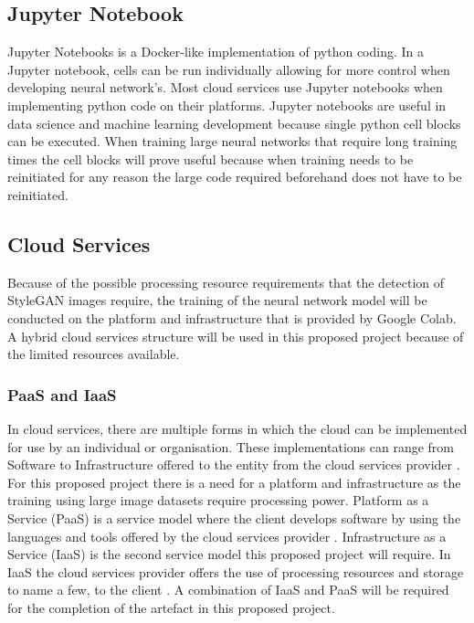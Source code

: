 \subsection{Jupyter Notebook}

Jupyter Notebooks is a Docker-like implementation of python coding. In a Jupyter notebook, cells can be run individually allowing for more control when developing neural network's. Most cloud services use Jupyter notebooks when implementing python code on their platforms. Jupyter notebooks are useful in data science and machine learning development because single python cell blocks can be executed. When training large neural networks that require long training times the cell blocks will prove useful because when training needs to be reinitiated for any reason the large code required beforehand does not have to be reinitiated.


\subsection{Cloud Services}

Because of the possible processing resource requirements that the detection of StyleGAN images require, the training of the neural network model will be conducted on the platform and infrastructure that is provided by Google Colab. A hybrid cloud services structure will be used in this proposed project because of the limited resources available.

\subsubsection{PaaS and IaaS}

In cloud services, there are multiple forms in which the cloud can be implemented for use by an individual or organisation. These implementations can range from Software to Infrastructure offered to the entity from the cloud services provider \citep{pfleeger2002}. For this proposed project there is a need for a platform and infrastructure as the training using large image datasets require processing power. Platform as a Service (PaaS) is a service model where the client develops software by using the languages and tools offered by the cloud services provider \citep{pfleeger2002}. Infrastructure as a Service (IaaS) is the second service model this proposed project will require. In IaaS the cloud services provider offers the use of processing resources and storage to name a few, to the client \citep{pfleeger2002}. A combination of IaaS and PaaS will be required for the completion of the artefact in this proposed project. 

